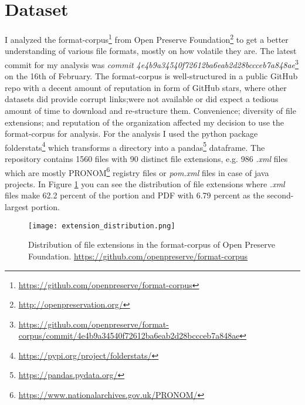 \section{Dataset}\label{sec:dataset}
I analyzed the format-corpus\footnote{\url{https://github.com/openpreserve/format-corpus}} from Open Preserve Foundation\footnote{\url{ http://openpreservation.org/}} to get a better understanding of various file formats, mostly on how volatile they are. The latest commit for my analysis was \textit{commit 4e4b9a34540f72612ba6eab2d28bccceb7a848ae}\footnote{\url{https://github.com/openpreserve/format-corpus/commit/4e4b9a34540f72612ba6eab2d28bccceb7a848ae}} on the 16th of February. The format-corpus is well-structured in a public GitHub repo with a decent amount of reputation in form of GitHub stars, where other datasets did provide corrupt links;were not available or did expect a tedious amount of time to download and re-structure them. Convenience; diversity of file extensions; and reputation of the organization affected my decision to use the format-corpus for analysis.
For the analysis I used the python package folderstats\footnote{\url{https://pypi.org/project/folderstats/}} which transforms a directory into a pandas\footnote{\url{https://pandas.pydata.org/}} dataframe. The repository contains 1560 files with 90 distinct file extensions, e.g. 986 \textit{.xml} files which are mostly PRONOM\footnote{\url{https://www.nationalarchives.gov.uk/PRONOM/}} registry files or \textit{pom.xml} files in case of java projects. In Figure \ref{fig:extension_distribution} you can see the distribution of file extensions where \textit{.xml} files make 62.2 percent of the portion and PDF with 6.79 percent as the second-largest portion.
\begin{figure}[h]
    \caption{Distribution of file extensions in the format-corpus of Open Preserve Foundation. \url{https://github.com/openpreserve/format-corpus}}
    \label{fig:extension_distribution}
    \centering
    \texttt{[image: extension\_distribution.png]}
\end{figure}

